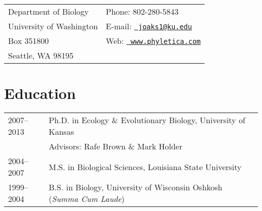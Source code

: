 \documentclass[10pt]{article}
\begin{document}
\raggedright
\singlespacing

\noindent\begin{tabular*}{\textwidth}[tb]{ @{}l @{\extracolsep{\fill}} l@{}}
Department of Biology & Phone: 802-280-5843 \\
University of Washington & E-mail: \href{mailto:joaks1@gmail.com}{\tt
                          joaks1@ku.edu} \\
Box 351800 & Web: \href{http://www.phyletica.com}{\tt
                          www.phyletica.com} \\
Seattle, WA 98195  & \\
\end{tabular*}

\section*{Education}
\noindent\begin{tabulary}{\textwidth}{ @{} l L @{} }
2007--2013 & Ph.D. in Ecology \& Evolutionary Biology, University of Kansas \\
              & \addtolength{\leftskip}{5mm}Advisors:  Rafe Brown \& Mark
                Holder \\[0.25em]
2004--2007    & M.S. in Biological Sciences, Louisiana State University
                \\[0.25em]
1999--2004    & B.S. in Biology, University of Wisconsin Oshkosh (\emph{Summa
                Cum Laude}) \\
\end{tabulary}
\end{document}
